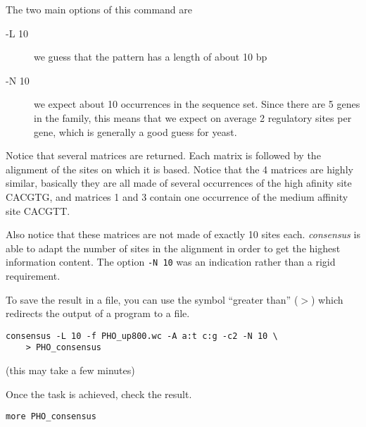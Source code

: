 The two main options of this command are 

\begin{description}
\item[-L 10] we guess that the pattern has a length of about 10 bp

\item[-N 10] we expect about 10 occurrences in the sequence set. Since
there are 5 genes in the family, this means that we expect on average
2 regulatory sites per gene, which is generally a good guess for
yeast.

\end{description}

Notice that several matrices are returned. Each matrix is followed by
the alignment of the sites on which it is based. Notice that the 4
matrices are highly similar, basically they are all made of several
occurrences of the high afinity site CACGTG, and matrices 1 and 3
contain one occurrence of the medium affinity site CACGTT. 

Also notice that these matrices are not made of exactly 10 sites
each. \textit{consensus} is able to adapt the number of sites in the
alignment in order to get the highest information content. The option
\texttt{-N 10} was an indication rather than a rigid requirement.

To save the result in a file, you can use the symbol ``greater than''
($>$) which redirects the output of a program to a file.

\begin{verbatim}
consensus -L 10 -f PHO_up800.wc -A a:t c:g -c2 -N 10 \
    > PHO_consensus
\end{verbatim}

(this may take a few minutes)

Once the task is achieved, check the result.

\begin{verbatim}
more PHO_consensus
\end{verbatim}
